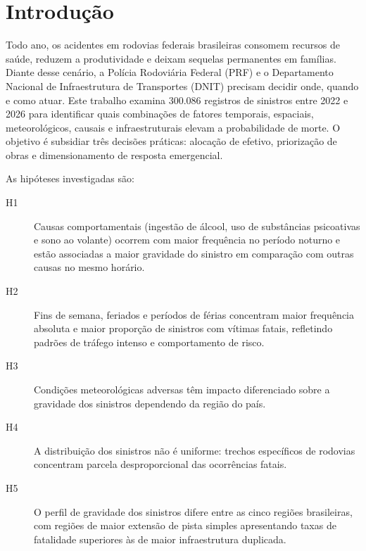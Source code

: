 \documentclass[12pt]{article}
\begin{document}

\newpage

\section{Introdução}

Todo ano, os acidentes em rodovias federais brasileiras consomem
recursos de saúde, reduzem a produtividade e deixam sequelas
permanentes em famílias. Diante desse cenário, a Polícia Rodoviária
Federal (PRF) e o Departamento Nacional de Infraestrutura de
Transportes (DNIT) precisam decidir onde, quando e como atuar.
Este trabalho examina 300.086 registros de sinistros entre 2022 e
2026 para identificar quais combinações de fatores temporais,
espaciais, meteorológicos, causais e infraestruturais elevam a
probabilidade de morte. O objetivo é subsidiar três decisões
práticas: alocação de efetivo, priorização de obras e
dimensionamento de resposta emergencial.

As hipóteses investigadas são:

\begin{description}
  \item[H1] Causas comportamentais (ingestão de álcool, uso de
    substâncias psicoativas e sono ao volante) ocorrem com maior
    frequência no período noturno e estão associadas a maior
    gravidade do sinistro em comparação com outras causas no
    mesmo horário.

  \item[H2] Fins de semana, feriados e períodos de férias concentram
    maior frequência absoluta e maior proporção de sinistros com
    vítimas fatais, refletindo padrões de tráfego intenso e
    comportamento de risco.

  \item[H3] Condições meteorológicas adversas têm impacto
    diferenciado sobre a gravidade dos sinistros dependendo da
    região do país.

  \item[H4] A distribuição dos sinistros não é uniforme: trechos
    específicos de rodovias concentram parcela desproporcional
    das ocorrências fatais.

  \item[H5] O perfil de gravidade dos sinistros difere entre as
    cinco regiões brasileiras, com regiões de maior extensão de
    pista simples apresentando taxas de fatalidade superiores
    às de maior infraestrutura duplicada.
\end{description}
\end{document}
